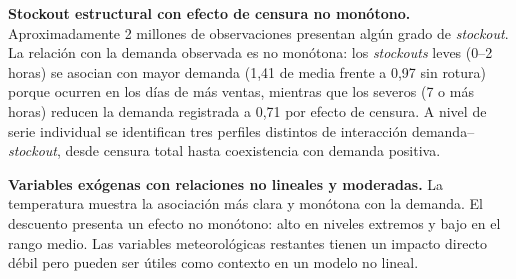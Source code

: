 \textbf{Stockout estructural con efecto de censura no monótono.} Aproximadamente 2 millones de observaciones presentan algún grado de \textit{stockout}. La relación con la demanda observada es no monótona: los \textit{stockouts} leves (0--2 horas) se asocian con mayor demanda (1,41 de media frente a 0,97 sin rotura) porque ocurren en los días de más ventas, mientras que los severos (7 o más horas) reducen la demanda registrada a 0,71 por efecto de censura. A nivel de serie individual se identifican tres perfiles distintos de interacción demanda--\textit{stockout}, desde censura total hasta coexistencia con demanda positiva.

\textbf{Variables exógenas con relaciones no lineales y moderadas.} La temperatura muestra la asociación más clara y monótona con la demanda. El descuento presenta un efecto no monótono: alto en niveles extremos y bajo en el rango medio. Las variables meteorológicas restantes tienen un impacto directo débil pero pueden ser útiles como contexto en un modelo no lineal.
